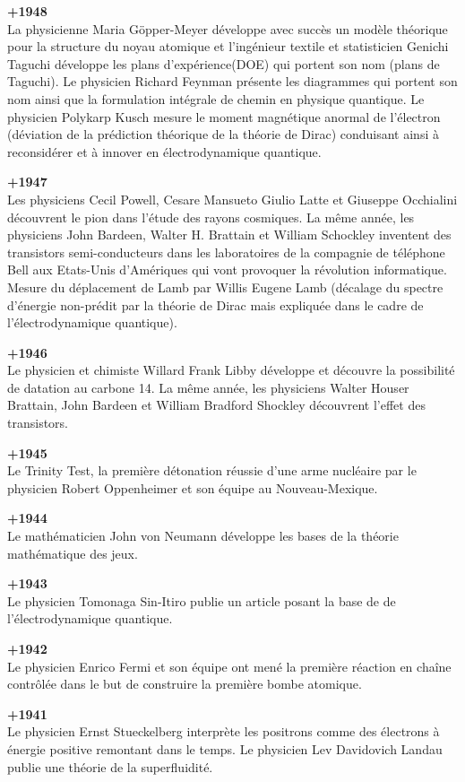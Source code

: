 \textbf{+1948}\\
La physicienne Maria Göpper-Meyer développe avec succès un modèle théorique pour la structure du noyau atomique et l'ingénieur textile et statisticien Genichi Taguchi développe les plans d'expérience(DOE) qui portent son nom (plans de Taguchi). Le physicien Richard Feynman présente les diagrammes qui portent son nom ainsi que la formulation intégrale de chemin  en physique quantique. Le physicien Polykarp Kusch mesure le moment magnétique anormal de l'électron (déviation de la prédiction théorique de la théorie de Dirac) conduisant ainsi à reconsidérer et à innover en électrodynamique quantique.

\textbf{+1947}\\
Les physiciens Cecil Powell, Cesare Mansueto Giulio Latte et Giuseppe Occhialini découvrent le pion dans l'étude des rayons cosmiques. La même année, les physiciens John Bardeen, Walter H. Brattain et William Schockley inventent des transistors semi-conducteurs dans les laboratoires de la compagnie de téléphone Bell aux Etats-Unis d'Amériques qui vont provoquer la révolution informatique. Mesure du déplacement de Lamb par Willis Eugene Lamb (décalage du spectre d'énergie non-prédit par la théorie de Dirac mais expliquée dans le cadre de l'électrodynamique quantique).

\textbf{+1946}\\
Le physicien et chimiste Willard Frank Libby développe et découvre la possibilité de datation au carbone 14. La même année, les physiciens Walter Houser Brattain, John Bardeen et William Bradford Shockley découvrent l'effet des transistors.

\textbf{+1945}\\
Le Trinity Test, la première détonation réussie d'une arme nucléaire par le physicien Robert Oppenheimer et son équipe au Nouveau-Mexique.

\textbf{+1944}\\
Le mathématicien John von Neumann développe les bases de la théorie mathématique des jeux.

\textbf{+1943}\\
Le physicien Tomonaga Sin-Itiro publie un article posant la base de de l'électrodynamique quantique.

\textbf{+1942}\\
Le physicien Enrico Fermi et son équipe ont mené la première réaction en chaîne contrôlée dans le but de construire la première bombe atomique.

\textbf{+1941}\\
Le physicien Ernst Stueckelberg interprète les positrons comme des électrons à énergie positive remontant dans le temps. Le physicien Lev Davidovich Landau publie une théorie de la superfluidité.


